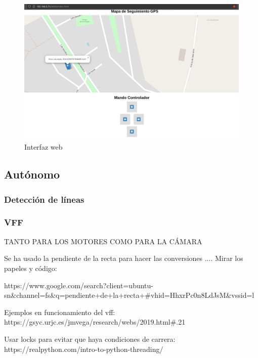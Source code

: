 
 \begin{figure} [h!]
	\begin{center}
		\includegraphics[width=15cm]{figs/cap6/interfazweb.png}
	\end{center}
	\caption{Interfaz web}
	\label{fig:interfazweb}
\end{figure}


\subsection{Autónomo}
\label{subsec:autonomo}

\subsubsection{Detección de líneas}
\label{subsubsec:softwaredl}

\subsubsection{VFF}
\label{subsubsec:vff}

TANTO PARA LOS MOTORES COMO PARA LA CÁMARA

Se ha usado la pendiente de la recta para hacer las conversiones .... Mirar los papeles y código: 

https://www.google.com/search?client=ubuntu-sn\&channel=fs\&q=pendiente+de+la+recta+\#vhid=HhxrPc0n8LdJsM\&vssid=l

Ejemplos en funcionamiento del vff:
https://gsyc.urjc.es/jmvega/research/webs/2019.html\#.21


Usar locks para evitar que haya condiciones de carrera: https://realpython.com/intro-to-python-threading/


